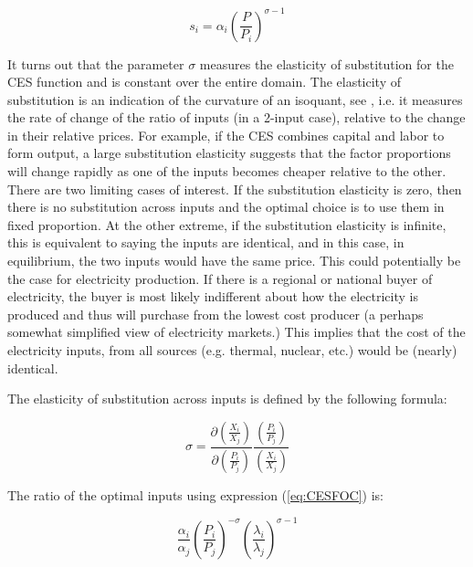 \begin{displaymath}
{{s}_{i}}={{\alpha }_{i}}{{\left( \frac{P}{{{P}_{i}}} \right)}^{\sigma -1}}
\end{displaymath}

It turns out that the parameter $\sigma$ measures the elasticity of substitution for the CES
function and is constant over the entire domain. The elasticity of substitution is an indication of
the curvature of an isoquant, see \cite{Varian1992}, i.e. it measures the rate of change of the ratio of
inputs (in a 2-input case), relative to the change in their relative prices. For example, if the CES
combines capital and labor to form output, a large substitution elasticity suggests that the
factor proportions will change rapidly as one of the inputs becomes cheaper relative to the
other. There are two limiting cases of interest. If the substitution elasticity is zero,
then there is no substitution across inputs and the optimal choice is to use them in fixed
proportion. At the other extreme, if the substitution elasticity is infinite, this is equivalent
to saying the inputs are identical, and in this case, in equilibrium, the two inputs would have
the same price. This could potentially be the case for electricity production. If there is a
regional or national buyer of electricity, the buyer is most likely indifferent about how the
electricity is produced and thus will purchase from the lowest cost producer (a perhaps
somewhat simplified view of electricity markets.) This implies that the cost of the electricity
inputs, from all sources (e.g. thermal, nuclear, etc.) would be (nearly) identical.

The elasticity of substitution across inputs is defined by the following formula:

\begin{displaymath}
\sigma =\frac{\partial \left( \frac{{{X}_{i}}}{{{X}_{j}}} \right)}{\partial \left(
\frac{{{P}_{i}}}{{{P}_{j}}} \right)}\frac{\left( \frac{{{P}_{i}}}{{{P}_{j}}}
\right)}{\left( \frac{{{X}_{i}}}{{{X}_{j}}} \right)}
\end{displaymath}

The ratio of the optimal inputs using expression (\ref{eq:CESFOC}) is:

\begin{displaymath}
\frac{{{\alpha }_{i}}}{{{\alpha }_{j}}}{{\left( \frac{{{P}_{i}}}{{{P}_{j}}} \right)}^{-
\sigma }}{{\left( \frac{{{\lambda }_{i}}}{{{\lambda }_{j}}} \right)}^{\sigma -1}}
\end{displaymath}

